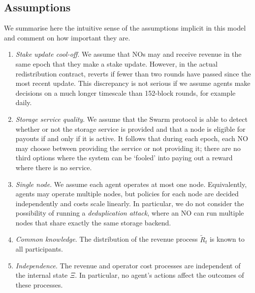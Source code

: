 \subsection{Assumptions}

We summarise here the intuitive sense of the assumptions implicit in this model and comment on how important they are.

\begin{enumerate}
  \item \emph{Stake update cool-off}. %
    We assume that NOs may  and receive revenue in the same epoch that they make a stake update.
    However, in the actual redistribution contract,  reverts if fewer than two rounds have passed since the most recent update.
    This discrepancy is not serious if we assume agents make decisions on a much longer timescale than 152-block rounds, for example daily.

  \item \emph{Storage service quality}. %
    We assume that the Swarm protocol is able to detect whether or not the storage service is provided and that a node is eligible for payouts if and only if it is active.
    It follows that during each epoch, each NO may choose between providing the service or not providing it; there are no third options where the system can be `fooled' into paying out a reward where there is no service.

  \item \emph{Single node}.
    We assume each agent operates at most one node.
    Equivalently, agents may operate multiple nodes, but policies for each node are decided independently and costs scale linearly.
    In particular, we do not consider the possibility of running a \emph{deduplication attack}, where an NO can run multiple nodes that share exactly the same storage backend.

  \item \emph{Common knowledge}.
    The distribution of the revenue process $\tilde{R}_t$ is known to all participants.

  \item \emph{Independence}.
    The revenue and operator cost processes are independent of the internal state $\Xi$.
    In particular, no agent's actions affect the outcomes of these processes.



\end{enumerate}



